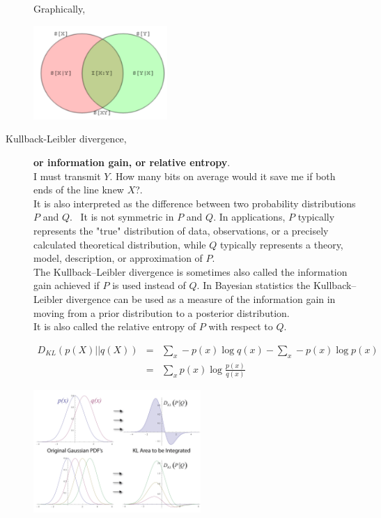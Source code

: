 \documentclass[10pt,landscape]{article}
\begin{document}
\begin{multicols*}{3}
\begin{description}
    Graphically,

    \begin{minipage}{\linewidth}
        \centering
        \includegraphics[width=2in]{figures/informationTheory.png}
    \end{minipage}

    \item[Kullback-Leibler divergence,] \textbf{or information gain, or relative entropy}. \\
    I must transmit $Y$. How many bits
    on average would it save me if both ends of the line knew $X$?.  \\
    It is also interpreted as the difference between two probability distributions $P$ and $Q$.  \
    It is not symmetric in $P$ and $Q$.  In applications, $P$ typically
    represents the "true" distribution of data, observations, or a precisely calculated theoretical distribution,
    while $Q$ typically represents a theory, model, description, or approximation of $P$. \\
    The Kullback–Leibler divergence is sometimes also called the information gain achieved if
    $P$ is used instead of $Q$. In Bayesian statistics the Kullback–Leibler divergence can be used as a
    measure of the information gain in moving from a prior distribution to a posterior distribution. \\
    It is also called the relative entropy of $P$ with respect to $Q$.

    \begin{align*}
        D_{KL}(p(X)||q(X)) &=& \sum_x -p(x)\log q(x) - \sum_x -p(x)\log p(x) \\
                           &=& \sum_x p(x) \log \frac{p(x)}{q(x)}
    \end{align*}

    \begin{minipage}{\linewidth}
        \centering
        \includegraphics[width=2.5in]{figures/kl.png}
    \end{minipage}


\end{description}
\end{multicols*}
\end{document}
